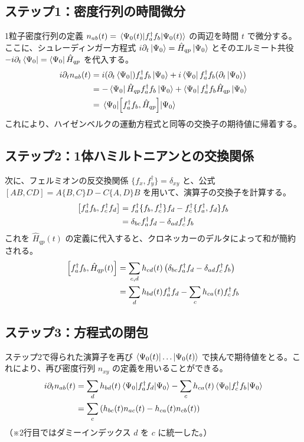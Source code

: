 \documentclass[a4paper,11pt]{ltjarticle}
\begin{document}
\subsection{ステップ1：密度行列の時間微分}
1粒子密度行列の定義 $n_{ab}(t) = \mel{\Psi_0(t)}{f_a^\dagger f_b}{\Psi_0(t)}$ の両辺を時間 $t$ で微分する。ここに、シュレーディンガー方程式 $i\partial_t \ket{\Psi_0} = \hat{H}_{qp}\ket{\Psi_0}$ とそのエルミート共役 $-i\partial_t \bra{\Psi_0} = \bra{\Psi_0}\hat{H}_{qp}$ を代入する。
\begin{align}
    i\partial_t n_{ab}(t) &= i (\partial_t \bra{\Psi_0}) f_a^\dagger f_b \ket{\Psi_0} + i \bra{\Psi_0} f_a^\dagger f_b (\partial_t \ket{\Psi_0}) \notag \\
    &= -\bra{\Psi_0} \hat{H}_{qp} f_a^\dagger f_b \ket{\Psi_0} + \bra{\Psi_0} f_a^\dagger f_b \hat{H}_{qp} \ket{\Psi_0} \notag \\
    &= \mel{\Psi_0}{\left[ f_a^\dagger f_b, \hat{H}_{qp} \right]}{\Psi_0}
\end{align}
これにより、ハイゼンベルクの運動方程式と同等の交換子の期待値に帰着する。

\subsection{ステップ2：1体ハミルトニアンとの交換関係}
次に、フェルミオンの反交換関係 $\{f_x, f_y^\dagger\} = \delta_{xy}$ と、公式 $[AB, CD] = A\{B,C\}D - C\{A,D\}B$ を用いて、演算子の交換子を計算する。
\begin{align}
    \left[ f_a^\dagger f_b, f_c^\dagger f_d \right] &= f_a^\dagger \{f_b, f_c^\dagger\} f_d - f_c^\dagger \{f_a^\dagger, f_d\} f_b \notag \\
    &= \delta_{bc} f_a^\dagger f_d - \delta_{ad} f_c^\dagger f_b
\end{align}
これを $\hat{H}_{qp}(t)$ の定義に代入すると、クロネッカーのデルタによって和が簡約される。
\begin{align}
    \left[ f_a^\dagger f_b, \hat{H}_{qp}(t) \right] &= \sum_{c,d} h_{cd}(t) \left( \delta_{bc} f_a^\dagger f_d - \delta_{ad} f_c^\dagger f_b \right) \notag \\
    &= \sum_{d} h_{bd}(t) f_a^\dagger f_d - \sum_{c} h_{ca}(t) f_c^\dagger f_b
\end{align}

\subsection{ステップ3：方程式の閉包}
ステップ2で得られた演算子を再び $\bra{\Psi_0(t)} \dots \ket{\Psi_0(t)}$ で挟んで期待値をとる。これにより、再び密度行列 $n_{xy}$ の定義を用いることができる。
\begin{align}
    i\partial_t n_{ab}(t) &= \sum_{d} h_{bd}(t) \mel{\Psi_0}{f_a^\dagger f_d}{\Psi_0} - \sum_{c} h_{ca}(t) \mel{\Psi_0}{f_c^\dagger f_b}{\Psi_0} \notag \\
    &= \sum_{c} \left( h_{bc}(t) n_{ac}(t) - h_{ca}(t) n_{cb}(t) \right) \label{eq:eom_density_derivation}
\end{align}
（※2行目ではダミーインデックス $d$ を $c$ に統一した。）
\end{document}
